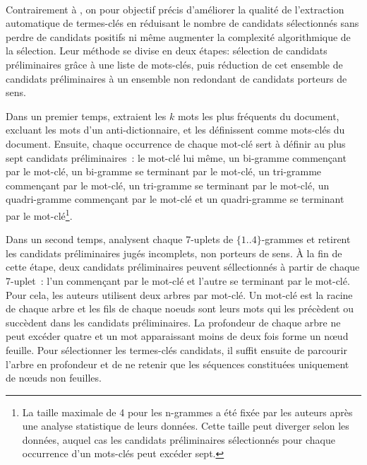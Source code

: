     ~\\Contrairement à ,
     on pour objectif précis d'améliorer
    la qualité de l'extraction automatique de termes-clés en réduisant le nombre
    de candidats sélectionnés sans perdre de candidats positifs ni même
    augmenter la complexité algorithmique de la sélection. Leur méthode se
    divise en deux étapes: sélection de candidats préliminaires grâce à une
    liste de mots-clés, puis réduction de cet ensemble de candidats
    préliminaires à un ensemble non redondant de candidats porteurs de sens.

    Dans un premier temps,  extraient les
    $k$ mots les plus fréquents du document, excluant les mots d'un
    anti-dictionnaire, et les définissent comme mots-clés du document. Ensuite,
    chaque occurrence de chaque mot-clé sert à définir au plus sept candidats
    préliminaires~: le mot-clé lui même, un bi-gramme commençant par le mot-clé,
    un bi-gramme se terminant par le mot-clé, un tri-gramme commençant par le
    mot-clé, un tri-gramme se terminant par le mot-clé, un quadri-gramme
    commençant par le mot-clé et un quadri-gramme se terminant par le
    mot-clé\footnote{La taille maximale de 4 pour les n-grammes a été fixée par
    les auteurs après une analyse statistique de leurs données. Cette taille peut
    diverger selon les données, auquel cas les candidats préliminaires
    sélectionnés pour chaque occurrence d'un mots-clés peut excéder sept.}.

    \begin{example}
    \end{example}

    Dans un second temps,  analysent chaque
    7-uplets de $\{1..4\}$-grammes et retirent les candidats préliminaires jugés
    incomplets, non porteurs de sens. À la fin de cette étape, deux candidats
    préliminaires peuvent séllectionnés à partir de chaque 7-uplet~: l'un
    commençant par le mot-clé et l'autre se terminant par le mot-clé. Pour cela,
    les auteurs utilisent deux arbres par mot-clé. Un mot-clé est la racine de
    chaque arbre et les fils de chaque noeuds sont leurs mots qui les précèdent
    ou succèdent dans les candidats préliminaires. La profondeur de chaque arbre
    ne peut excéder quatre et un mot apparaissant moins de deux fois forme un
    n\oe{}ud feuille. Pour sélectionner les termes-clés candidats, il suffit
    ensuite de parcourir l'arbre en profondeur et de ne retenir que les
    séquences constituées uniquement de n\oe{}uds non feuilles.

